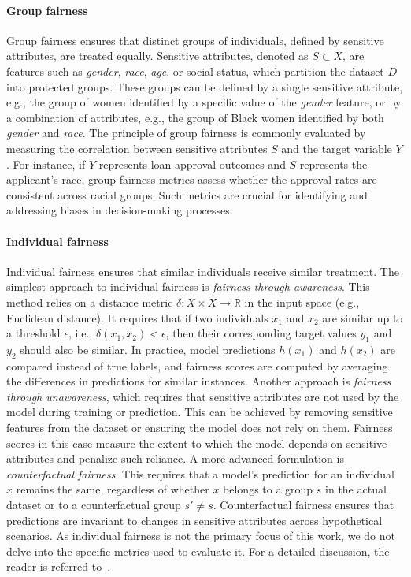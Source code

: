 \paragraph{Group fairness}\label{par:group-fairness}
%
Group fairness ensures that distinct groups of individuals, defined by sensitive attributes, are treated equally.
%
Sensitive attributes, denoted as \( S \subset X \), are features such as \emph{gender}, \emph{race}, \emph{age}, or social status, which partition the dataset \( D \) into protected groups.
%
These groups can be defined by a single sensitive attribute, e.g., the group of women identified by a specific value of the \textit{gender} feature, or by a combination of attributes, e.g., the group of Black women identified by both \textit{gender} and \textit{race}.
%
The principle of group fairness is commonly evaluated by measuring the correlation between sensitive attributes \( S \) and the target variable \( Y \).
%
For instance, if \( Y \) represents loan approval outcomes and \( S \) represents the applicant's race, group fairness metrics assess whether the approval rates are consistent across racial groups.
%
Such metrics are crucial for identifying and addressing biases in decision-making processes.


\paragraph{Individual fairness}\label{par:individual-fairness}
%
Individual fairness ensures that similar individuals receive similar treatment.
%
The simplest approach to individual fairness is \emph{fairness through awareness}.
%
This method relies on a distance metric \(\delta : X \times X \to \mathbb{R}\) in the input space (e.g., Euclidean distance).
%
It requires that if two individuals \(x_1\) and \(x_2\) are similar up to a threshold \(\epsilon\), i.e., \(\delta(x_1, x_2) < \epsilon\), then their corresponding target values \(y_1\) and \(y_2\) should also be similar.
%
In practice, model predictions \(h(x_1)\) and \(h(x_2)\) are compared instead of true labels, and fairness scores are computed by averaging the differences in predictions for similar instances.
%
Another approach is \emph{fairness through unawareness}, which requires that sensitive attributes are not used by the model during training or prediction.
%
This can be achieved by removing sensitive features from the dataset or ensuring the model does not rely on them.
%
Fairness scores in this case measure the extent to which the model depends on sensitive attributes and penalize such reliance.
%
A more advanced formulation is \emph{counterfactual fairness}.
%
This requires that a model's prediction for an individual \(x\) remains the same, regardless of whether \(x\) belongs to a group \(s\) in the actual dataset or to a counterfactual group \(s' \neq s\).
%
Counterfactual fairness ensures that predictions are invariant to changes in sensitive attributes across hypothetical scenarios.
%
As individual fairness is not the primary focus of this work, we do not delve into the specific metrics used to evaluate it.
%
For a detailed discussion, the reader is referred to~\cite{mehrabi2022fairness}.


